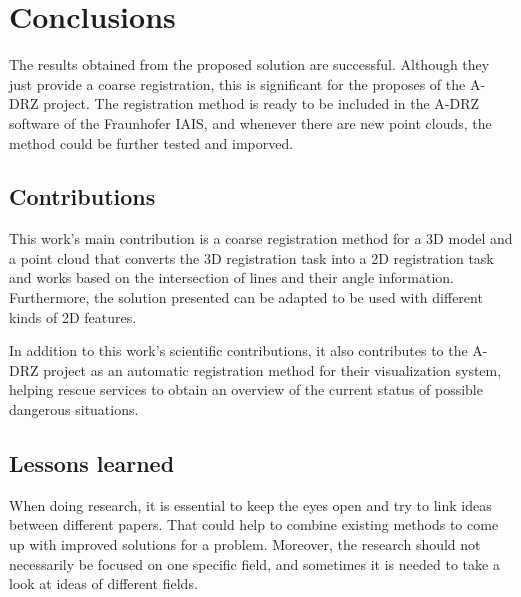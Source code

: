 

    \chapter{Conclusions}

    The results obtained from the proposed solution are successful. 
    Although they just provide a coarse registration, this is significant for the proposes of the A-DRZ project.
    The registration method is ready to be included in the A-DRZ software of the Fraunhofer IAIS,
    and whenever there are new point clouds, the method could be further tested and imporved.

    \section{Contributions}
        This work’s main contribution is a coarse registration method for a 3D model and a point cloud 
        that converts the 3D registration task into a 2D registration task and works based on the intersection of lines and their angle information. 
        Furthermore, the solution presented can be adapted to be used with different kinds of 2D features.
    
        In addition to this work’s scientific contributions, 
        it also contributes to the A-DRZ project as an automatic registration method for their visualization system, 
        helping rescue services to obtain an overview of the current status of possible dangerous situations.
    

    \section{Lessons learned}
        When doing research, it is essential to keep the eyes open and try to link ideas between different papers. 
        That could help to combine existing methods to come up with improved solutions for a problem. 
        Moreover, the research should not necessarily be focused on one specific field, 
        and sometimes it is needed to take a look at ideas of different fields.

